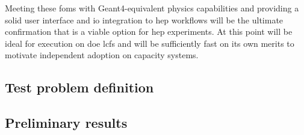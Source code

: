 Meeting these \acp{fom} with Geant4-equivalent physics capabilities and
providing a solid user interface and \ac{io} integration to \ac{hep} workflows
will be the ultimate confirmation that \celeritas is a viable option for
\ac{hep} experiments. At this point \celeritas will be ideal for execution on
\ac{doe} \acp{lcf} and will be sufficiently fast on its own merits to motivate
independent adoption on capacity systems.

\subsection{Test problem definition}

\subsection{Preliminary results}
